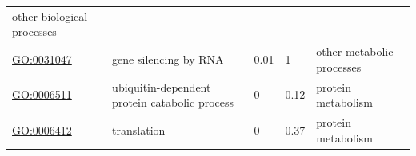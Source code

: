 \documentclass[
]{article}
\begin{document}
\begin{longtable}[]{@{}lllll@{}}
\begin{minipage}[t]{0.17\columnwidth}
other biological processes\strut
\end{minipage}\tabularnewline
\begin{minipage}[t]{0.17\columnwidth}\raggedright
\url{GO:0031047}\strut
\end{minipage} & \begin{minipage}[t]{0.17\columnwidth}\raggedright
gene silencing by RNA\strut
\end{minipage} & \begin{minipage}[t]{0.17\columnwidth}\raggedright
0.01\strut
\end{minipage} & \begin{minipage}[t]{0.17\columnwidth}\raggedright
1\strut
\end{minipage} & \begin{minipage}[t]{0.17\columnwidth}\raggedright
other metabolic processes\strut
\end{minipage}\tabularnewline
\begin{minipage}[t]{0.17\columnwidth}\raggedright
\url{GO:0006511}\strut
\end{minipage} & \begin{minipage}[t]{0.17\columnwidth}\raggedright
ubiquitin-dependent protein catabolic process\strut
\end{minipage} & \begin{minipage}[t]{0.17\columnwidth}\raggedright
0\strut
\end{minipage} & \begin{minipage}[t]{0.17\columnwidth}\raggedright
0.12\strut
\end{minipage} & \begin{minipage}[t]{0.17\columnwidth}\raggedright
protein metabolism\strut
\end{minipage}\tabularnewline
\begin{minipage}[t]{0.17\columnwidth}\raggedright
\url{GO:0006412}\strut
\end{minipage} & \begin{minipage}[t]{0.17\columnwidth}\raggedright
translation\strut
\end{minipage} & \begin{minipage}[t]{0.17\columnwidth}\raggedright
0\strut
\end{minipage} & \begin{minipage}[t]{0.17\columnwidth}\raggedright
0.37\strut
\end{minipage} & \begin{minipage}[t]{0.17\columnwidth}\raggedright
protein metabolism\strut
\end{minipage}\tabularnewline

\end{longtable}
\end{document}
